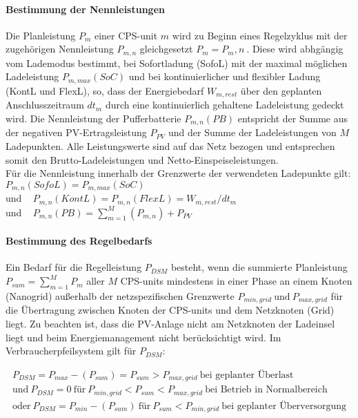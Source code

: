 		\paragraph{Bestimmung der Nennleistungen} %
			Die Planleistung $P_m$ einer CPS-unit $m$ wird zu Beginn eines Regelzyklus mit der zugehörigen Nennleistung $P_{m,n}$ gleichgesetzt $P_m = P_m,n~$. Diese wird abhgängig vom Lademodus bestimmt, bei Sofortladung (SofoL) mit der maximal möglichen Ladeleistung $P_{m,max}(SoC)$ und bei kontinuierlicher und flexibler Ladung (KontL und FlexL), so, dass der Energiebedarf $W_{m,rest}$ über den geplanten Anschlusszeitraum $dt_m$ durch eine kontinuierlich gehaltene Ladeleistung gedeckt wird. Die Nennleistung der Pufferbatterie $P_{m,n}(PB)$ entspricht der Summe aus der negativen PV-Ertragsleistung $P_{PV}$ und der Summe der Ladeleistungen von $M$ Ladepunkten. Alle Leistungswerte sind auf das Netz bezogen und entsprechen somit den Brutto-Ladeleistungen und Netto-Einspeiseleistungen. \\
			
			Für die Nennleistung innerhalb der Grenzwerte der verwendeten Ladepunkte gilt: \\
			$P_{m,n}(SofoL) = P_{m,max}(SoC)$  \\
            und ~ $P_{m,n}(KontL) = P_{m,n}(FlexL) = W_{m,rest}/dt_m$ \\
            und ~ $P_{m,n}(PB) = \sum_{m=1}^{M}(P_{m,n}) + P_{PV} $ 
			
			
			
		\paragraph{Bestimmung des Regelbedarfs}
			Ein Bedarf für die Regelleistung $P_{DSM}$ besteht, wenn die summierte Planleistung $P_{sum} = \sum_{m=1}^{M} P_m$ aller $M$ CPS-units mindestens in einer Phase an einem Knoten (Nanogrid) außerhalb der netzspezifischen Grenzwerte $P_{min,grid} ~\text{und}~ P_{max,grid}$ für die Übertragung zwischen Knoten der CPS-units und dem Netzknoten (Grid) liegt. Zu beachten ist, dass die PV-Anlage nicht am Netzknoten der Ladeinsel liegt und beim Energiemanagement nicht berücksichtigt wird. Im Verbraucherpfeilsystem gilt für $P_{DSM}$: 
					
		\begin{equation}
			\begin{split}
				P_{DSM} = P_{max}  - (P_{sum}) = P_{sum} > P_{max,grid} ~\text{bei geplanter Überlast}\\
				\text{und}~ P_{DSM} = 0 ~\text{für}~ P_{min,grid} < P_{sum} < P_{max,grid} ~\text{bei Betrieb in Normalbereich}\\	
				\text{oder}~ P_{DSM} =  P_{min}  - (P_{sum}) ~\text{für}~ P_{sum} < P_{min,grid} ~\text{bei geplanter Überversorgung}\\
			\end{split}  
		\end{equation}

